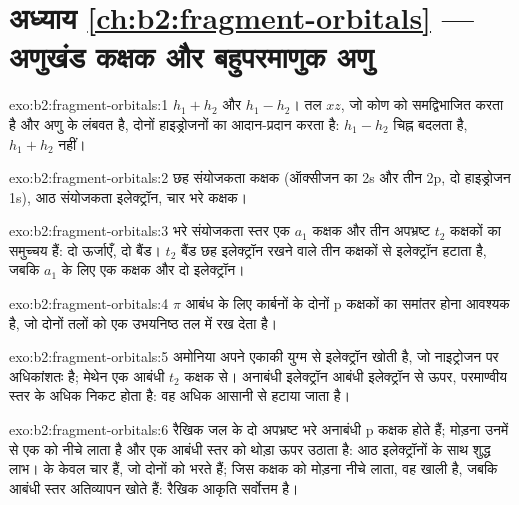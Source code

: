 \section*{अध्याय \ref{ch:b2:fragment-orbitals} --- अणुखंड कक्षक और बहुपरमाणुक अणु}

\begin{solution}{exo:b2:fragment-orbitals:1}
$h_1 + h_2$ और $h_1 - h_2$। तल $xz$, जो कोण को समद्विभाजित करता है और
अणु के लंबवत है, दोनों हाइड्रोजनों का आदान-प्रदान करता है: $h_1 - h_2$ चिह्न
बदलता है, $h_1 + h_2$ नहीं।
\end{solution}

\begin{solution}{exo:b2:fragment-orbitals:2}
छह संयोजकता कक्षक (ऑक्सीजन का 2s और तीन 2p, दो हाइड्रोजन 1s), आठ संयोजकता
इलेक्ट्रॉन, चार भरे कक्षक।
\end{solution}

\begin{solution}{exo:b2:fragment-orbitals:3}
भरे संयोजकता स्तर एक $a_1$ कक्षक और तीन अपभ्रष्ट $t_2$
कक्षकों का समुच्चय हैं: दो ऊर्जाएँ, दो बैंड। $t_2$ बैंड छह इलेक्ट्रॉन रखने वाले तीन
कक्षकों से इलेक्ट्रॉन हटाता है, जबकि $a_1$ के लिए एक कक्षक और दो इलेक्ट्रॉन।
\end{solution}

\begin{solution}{exo:b2:fragment-orbitals:4}
$\pi$ आबंध के लिए कार्बनों के दोनों p कक्षकों का समांतर होना आवश्यक है, जो
दोनों  तलों को एक उभयनिष्ठ तल में रख देता है।
\end{solution}

\begin{solution}{exo:b2:fragment-orbitals:5}
अमोनिया अपने एकाकी युग्म से इलेक्ट्रॉन खोती है, जो नाइट्रोजन पर अधिकांशतः  है;
मेथेन एक आबंधी $t_2$ कक्षक से। अनाबंधी इलेक्ट्रॉन आबंधी इलेक्ट्रॉन से ऊपर,
परमाण्वीय स्तर के अधिक निकट होता है: वह अधिक आसानी से हटाया जाता है।
\end{solution}

\begin{solution}{exo:b2:fragment-orbitals:6}
रैखिक जल के दो अपभ्रष्ट भरे अनाबंधी p कक्षक होते हैं; मोड़ना उनमें से एक को नीचे
लाता है और एक आबंधी स्तर को थोड़ा ऊपर उठाता है: आठ इलेक्ट्रॉनों के साथ शुद्ध लाभ। 
के केवल चार हैं, जो दोनों  को भरते हैं; जिस कक्षक को मोड़ना
नीचे लाता, वह खाली है, जबकि आबंधी स्तर अतिव्यापन खोते हैं: रैखिक आकृति सर्वोत्तम है।
\end{solution}

